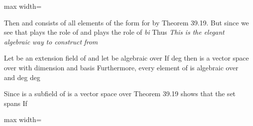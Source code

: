 \documentclass[11pt,oneside]{article}
\begin{document}
\begin{BookBody}
\end{BookBody}

\BookNarrativetrue

\begin{BookBody}

\begin{center}\begin{adjustbox}{max width=\linewidth}\end{adjustbox}\end{center}

\noindent Then  and consists of all elements of the form  for   by Theorem 39.19. But since  we see that \BookInline{\alpha } plays the role of  and  plays the role of  \textit{bi} Thus  \textit{This is the elegant algebraic} \textit{way to construct}  \textit{from} 

 Let  be an extension field of  and let  be algebraic over  If deg then  is a vector space over  with dimension  and basis  Furthermore, every element \BookInline{\beta } of  is algebraic over  and deg deg

 Since  is a subfield of  is a vector space over  Theorem 39.19 shows that the set  spans  If

\begin{center}\begin{adjustbox}{max width=\linewidth}\end{adjustbox}\end{center}


\end{BookBody}
\end{document}
